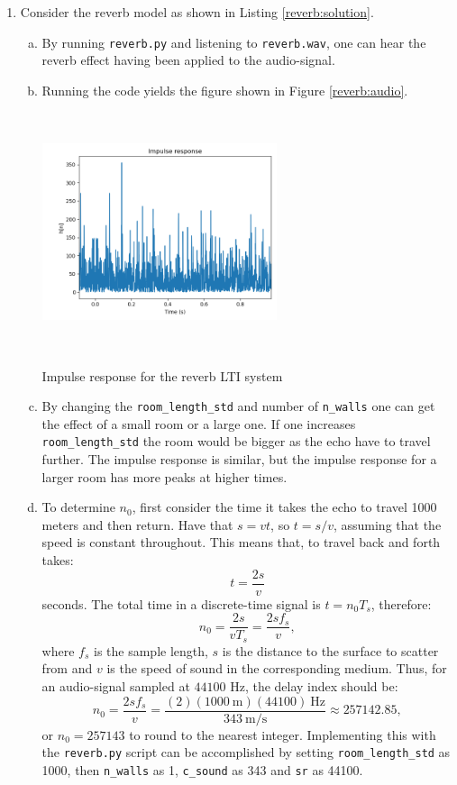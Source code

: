\begin{enumerate}
\item Consider the reverb model as shown in Listing \ref{reverb:solution}.
\begin{enumerate}[a)]
    \item By running \verb|reverb.py| and listening to \verb|reverb.wav|, one can 
    hear the reverb effect having been applied to the audio-signal.
    
    \item Running the code yields the figure shown in Figure \ref{reverb:audio}.
    \begin{marginfigure}
    \includegraphics[width=6.9cm,height=7.0cm]{ch10/figures/reverb_impulse.png}
    \caption{Impulse response for the reverb LTI system}
    \label{reverb:audio}
    \end{marginfigure}
    
    \item By changing the \verb|room_length_std| and number of \verb|n_walls| one can get the 
    effect of a small room or a large one. If one increases \verb|room_length_std| the 
    room would be bigger as the echo have to travel further. The impulse response is similar, 
    but the impulse response for a larger room has more peaks at higher times. 
    
    \item To determine $n_{0}$, first consider the time it takes the echo to travel 
    1000 meters and then return. Have that $s=vt$, so $t=s/v$, assuming that 
    the speed is constant throughout. This means that, to travel back and forth takes:
    $$t=\frac{2s}{v}$$
    seconds. The total time in a discrete-time signal is $t=n_{0}T_{s}$, therefore:
    $$n_{0}=\frac{2s}{vT_{s}}=\frac{2sf_{s}}{v},$$
    where $f_{s}$ is the sample length, $s$ is the distance to the surface to scatter 
    from and $v$ is the speed of sound in the corresponding medium. Thus, for an 
    audio-signal sampled at $44100$ Hz, the delay index should be:
    $$n_{0}=\frac{2sf_s}{v}=\frac{(2)(1000\ \text{m})(44100)\ \text{Hz}}{343\ \text{m/s}}\approx257142.85,$$
    or $n_{0}=257143$ to round to the nearest integer. Implementing this with the \verb|reverb.py| 
    script can be accomplished by setting \verb|room_length_std| as 1000, 
    then \verb|n_walls| as 1, \verb|c_sound| as 343 and \verb|sr| as 44100.
    

\end{enumerate}
\end{enumerate}
